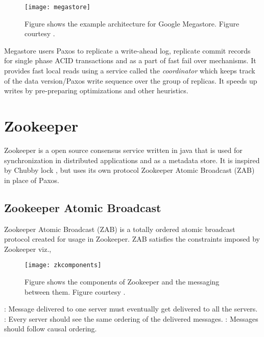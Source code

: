 \begin{figure}
  \texttt{[image: megastore]}
  \caption[Google Megastore]{%
    Figure shows the example architecture for Google Megastore.
    Figure courtesy \citet{BakerBCFKLLLLY11}.}
  \label{figure:megastore}
\end{figure}

Megastore users Paxos to replicate a write-ahead log, replicate commit
records for single phase ACID transactions and as a part of fast fail over
mechanisms. It provides fast local reads using a service called the
\emph{coordinator} which keeps track of the data version/Paxos write
sequence over the group of replicas. It speeds up writes by pre-preparing
optimizations and other heuristics.


\section{Zookeeper}
\label{section:zookeeper}

Zookeeper \citep{Hunt:2010:ZWC:1855840.1855851, zookeeper} is a open source 
consensus service written in java that is used for synchronization in 
distributed applications and as a metadata store. It is inspired by Chubby lock 
, but uses its own protocol Zookeeper Atomic Broadcast 
(ZAB) in place of Paxos.

\subsection{Zookeeper Atomic Broadcast}

Zookeeper Atomic Broadcast (ZAB) 
\citep{Reed:2008:STO:1529974.1529978, JunqueiraRS11} is a 
totally ordered atomic broadcast protocol created for usage in Zookeeper. ZAB
satisfies the constraints imposed by Zookeeper viz.,

\begin{figure}
  \texttt{[image: zkcomponents]}
  \caption[Zookeeper Components]{%
    Figure shows the components of Zookeeper and the messaging between them.
    Figure courtesy \citet{zookeeper}.}
  \label{figure:megastore}
\end{figure}


\begin{itemize}
    : Message delivered to one server must eventually
    get delivered to all the servers.
    : Every server should see the same ordering of the 
    delivered messages.
    : Messages should follow causal%
    ordering.
\end{itemize}

